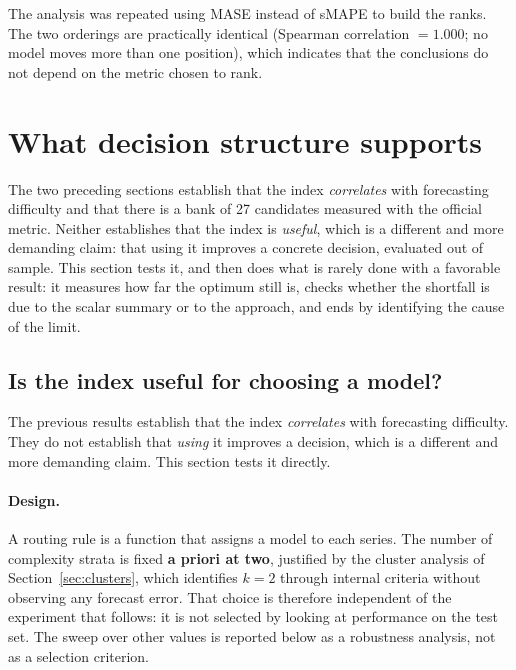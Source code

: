 The analysis was repeated using MASE instead of sMAPE to build the ranks. The two
orderings are practically identical (Spearman correlation $=1.000$; no model moves more
than one position), which indicates that the conclusions do not depend on the metric
chosen to rank.

\section{What decision structure supports}\label{sec:decision}

The two preceding sections establish that the index \emph{correlates} with forecasting
difficulty and that there is a bank of 27 candidates measured with the official metric.
Neither establishes that the index is \emph{useful}, which is a different and more
demanding claim: that using it improves a concrete decision, evaluated out of sample. This
section tests it, and then does what is rarely done with a favorable result: it measures
how far the optimum still is, checks whether the shortfall is due to the scalar summary or
to the approach, and ends by identifying the cause of the limit.

\subsection{Is the index useful for choosing a model?}\label{sec:enrutamiento}

The previous results establish that the index \emph{correlates} with forecasting
difficulty. They do not establish that \emph{using} it improves a decision, which is a
different and more demanding claim. This section tests it directly.

\paragraph{Design.} A routing rule is a function that assigns a model to each series. The
number of complexity strata is fixed \textbf{a priori at two}, justified by the cluster
analysis of Section~\ref{sec:clusters}, which identifies $k=2$ through internal criteria
without observing any forecast error. That choice is therefore independent of the
experiment that follows: it is not selected by looking at performance on the test set. The
sweep over other values is reported below as a robustness analysis, not as a selection
criterion.

